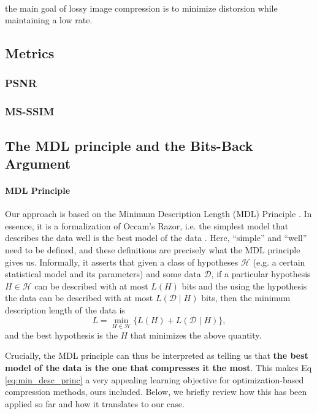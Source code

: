 \documentclass{article}
\newcommand{\Hypos}{\mathcal{H}}
\newcommand{\Data}{\mathcal{D}}
\begin{document}
\paragraph{}
the main goal of lossy image compression is to minimize distorsion while
maintaining a low rate. 
\subsection{Metrics}
\paragraph{}
\subsubsection{PSNR}
\cite{psnr}
\subsubsection{MS-SSIM}
\cite{msssim}
\subsection{The MDL principle and the Bits-Back Argument}
\paragraph{MDL Principle} 
Our approach is based on the Minimum Description Length (MDL) Principle
\cite{rissanen1986stochastic}. In essence, it is a formalization of Occam's
Razor, i.e. the simplest model that describes the data well is the best model of
the data \cite{grünwald2007minimum}. Here, ``simple'' and ``well'' need to be
defined, and these definitions are precisely what the MDL principle gives us.
Informally, it asserts that given a class of hypotheses $\Hypos$ (e.g. a certain
statistical model and its parameters) and some data $\Data$, if a particular
hypothesis $H \in \Hypos$ can be described with at most $L(H)$ bits and the using the
hypothesis the data can be described with at most $L(\Data \mid H)$ bits, then the
minimum description length of the data is
\begin{equation}
\label{eq:min_desc_princ}
  L = \min_{H \in \Hypos}\{ L(H) + L(\Data \mid H) \},
\end{equation}
and the best hypothesis is the $H$ that minimizes the above quantity.
\par
Crucially, the MDL principle can thus be interpreted as telling us that
\textbf{the best model of the data is the one that compresses it the most}.
This makes Eq \ref{eq:min_desc_princ} a very appealing learning objective for
optimization-based compression methods, ours included.
Below, we briefly review how this has been applied so far and how it translates
to our case.
\end{document}
